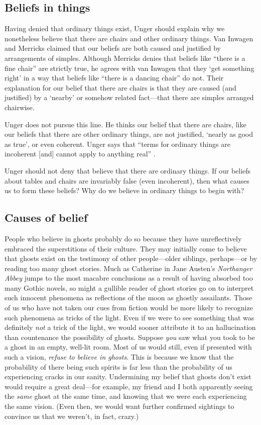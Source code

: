 \documentclass[11pt]{article}
\begin{document}
\begin{spacing}{1.5}
\section{Beliefs in things}
\label{beliefs}
Having denied that ordinary things exist, Unger should explain why we
nonetheless believe that there are chairs and other ordinary things.
Van Inwagen and Merricks claimed that our beliefs are both caused and
justified by arrangements of simples.  Although Merricks denies that
beliefs like ``there is a fine chair'' are strictly true, he agrees with
van Inwagen that they `get something right' in a way that beliefs like
``there is a dancing chair'' do not.  Their explanation for our
belief that there are chairs is that they are caused (and justified)
by a `nearby' or somehow related fact---that there are simples
arranged chairwise.  

Unger does not pursue this line.  He thinks our belief that there are
chairs, like our beliefs that there are other ordinary things, are not
justified, `nearly as good as true', or even coherent.  Unger says
that ``terms for ordinary things are incoherent [and] cannot apply to
anything real'' \citep[147]{unger1979}.

Unger should not deny that believe that there are ordinary things.  If
our beliefs about tables and chairs are invariably false (even
incoherent), then what causes us to form these beliefs?  Why do we
believe in ordinary things to begin with?

\subsection{Causes of belief}
\label{unger-cause}
People who believe in ghosts probably do so because they have
unreflectively embraced the superstitions of their culture.  They may
initially come to believe that ghosts exist on the testimony of other
people---older siblings, perhaps---or by reading too many ghost
stories.  Much as Catherine in Jane Austen's {\em Northanger Abbey}
jumps to the most macabre conclusions as a result of having absorbed
too many Gothic novels, so might a gullible reader of ghost stories go
on to interpret such innocent phenomena as reflections of the moon as
ghostly assailants.  Those of us who have not taken our cues from
fiction would be more likely to recognize such phenomena as tricks of
the light.  Even if we were to see something that was definitely {\em
  not} a trick of the light, we would sooner attribute it to an
hallucination than countenance the possibility of ghosts.  Suppose
{\em you} saw what you took to be a ghost in an empty, well-lit room.
Most of us would still, even if presented with such a vision, {\em
  refuse to believe in ghosts}.  This is because we know that the
probability of there being such spirits is far less than the
probability of us experiencing cracks in our sanity.  Undermining my
belief that ghosts don't exist would require a great deal---for
example, my friend and I both apparently seeing the {\em same} ghost
at the same time, and knowing that we were each experiencing the same
vision.  (Even then, we would want further confirmed sightings to
convince us that we weren't, in fact, crazy.)


\end{spacing}
\end{document}
